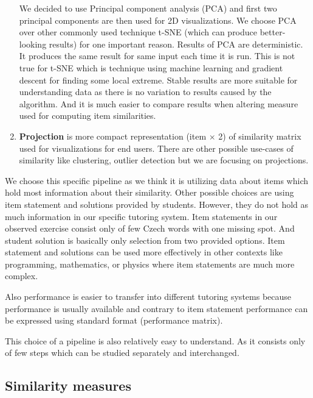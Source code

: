 \documentclass[
  digital, %
  table,   %
  nolof,     %
  nolot,     %
  nocover,
  color,
  final, %
]{fithesis3}
\begin{document}
\begin{enumerate}

    We decided to use Principal component analysis (PCA) and first two principal components are then used for 2D visualizations. We choose PCA over other commonly used technique t-SNE (which can produce better-looking results) for one important reason. Results of PCA are deterministic. It produces the same result for same input each time it is run. This is not true for t-SNE which is technique using machine learning and gradient descent for finding some local extreme. Stable results are more suitable for understanding data as there is no variation to results caused by the algorithm. And it is much easier to compare results when altering measure used for computing item similarities.

  \item
    \textbf{Projection} is more compact representation (item $\times$ 2) of similarity matrix used for visualizations for end users. There are other possible use-cases of similarity like clustering, outlier detection but we are focusing on projections.
\end{enumerate}


We choose this specific pipeline as we think it is utilizing data about items which hold most information about their similarity. Other possible choices are using item statement and solutions provided by students. However, they do not hold as much information in our specific tutoring system. Item statements in our observed exercise consist only of few Czech words with one missing spot. And student solution is basically only selection from two provided options. Item statement and solutions can be used more effectively in other contexts like programming, mathematics, or physics where item statements are much more complex.

Also performance is easier to transfer into different tutoring systems because performance is usually available and contrary to item statement performance can be expressed using standard format (performance matrix).

This choice of a pipeline is also relatively easy to understand. As it consists only of few steps which can be studied separately and interchanged.


\subsection{Similarity measures}\label{similarity-measures}
\end{document}
